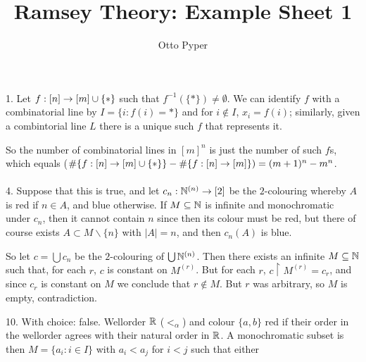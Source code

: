 \documentclass[10pt]{article}
\title{Ramsey Theory: Example Sheet 1}
\author{Otto Pyper}
\date{}
\begin{document}
\maketitle

1. Let $f : [n] \rightarrow [m]\cup\{\ast\}$ such that $f^{-1}(\{\ast\})\ne\emptyset$. We can identify $f$ with a combinatorial line by $I = \{i : f(i) = \ast\}$ and for $i\not\in I$, $x_i = f(i)$; similarly, given a combintorial line $L$ there is a unique such $f$ that represents it.

So the number of combinatorial lines in $[m]^n$ is just the number of such $f$s, which equals ($\#\{f:[n]\rightarrow [m]\cup\{\ast\}\} - \# \{f:[n]\rightarrow [m]\}) = (m+1)^n - m^n$.\ \\
\ \\

4. Suppose that this is true, and let $c_n : \mathbb{N}^{(n)}\rightarrow [2]$ be the $2$-colouring whereby $A$ is red if $n \in A$, and blue otherwise. If $M \subseteq \mathbb{N}$ is infinite and monochromatic under $c_n$, then it cannot contain $n$ since then its colour must be red, but there of course exists $A\subset M\backslash \{n\}$ with $|A| = n$, and then $c_n(A)$ is blue.

So let $c = \bigcup c_n$ be the $2$-colouring of $\bigcup \mathbb{N}^{(n)}$. Then there exists an infinite $M\subseteq \mathbb{N}$ such that, for each $r$, $c$ is constant on $M^{(r)}$. But for each $r$, $c\restriction M^{(r)} = c_r$, and since $c_r$ is constant on $M$ we conclude that $r \not \in M$. But $r$ was arbitrary, so $M$ is empty, contradiction.

10. With choice: false. Wellorder $\mathbb{R}$ ($<_\alpha$) and colour $\{a,b\}$ red if their order in the wellorder agrees with their natural order in $\mathbb{R}$. A monochromatic subset is then $M = \{a_i : i \in I\}$ with $a_i < a_j$ for $i < j$ such that either 
\end{document}
